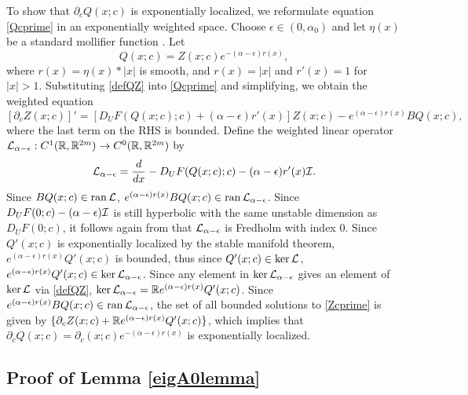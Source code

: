 \documentclass[10pt,reqno]{amsart}
\theoremstyle{plain}
\theoremstyle{definition}
\theoremstyle{remark}
\numberwithin{theorem}{section}
\numberwithin{equation}{section}
\begin{document}
To show that $\partial_c Q(x; c)$ is exponentially localized, we reformulate equation \cref{Qcprime} in an exponentially weighted space. Choose $\epsilon \in (0,\alpha_0)$ and let $\eta(x)$ be a standard mollifier function \cite[Section~C.5]{Evans2010}. Let
\begin{equation}\label{defQZ}
Q(x; c) = Z(x; c) e^{-(\alpha - \epsilon)r(x)},
\end{equation}
where $r(x) = \eta(x) * |x|$ is smooth, and $r(x) = |x|$ and $r'(x) = 1$ for $|x| > 1$. Substituting \cref{defQZ} into \cref{Qcprime} and simplifying, we obtain the weighted equation
\begin{equation}\label{Zcprime}
[\partial_c Z(x; c)]' = [D_U F(Q(x;c); c) + (\alpha - \epsilon) r'(x) ] Z(x; c) - e^{(\alpha - \epsilon)r(x)} B Q(x;c),
\end{equation}
where the last term on the RHS is bounded. Define the weighted linear operator $\mathcal{L}_{\alpha - \epsilon}: C^1(\mathbb{R}, \mathbb{R}^{2m}) \rightarrow C^0(\mathbb{R}, \mathbb{R}^{2m})$ by
\begin{equation}\label{defLtvalpha}
\mathcal{L}_{\alpha - \epsilon} = \frac{d}{dx} - D_U F(Q(x;c); c) - (\alpha - \epsilon) r'(x) \mathcal{I}.
\end{equation}
Since $B Q(x;c) \in \operatorname{ran} \mathcal{L}$, $e^{(\alpha - \epsilon)r(x)} B Q(x;c) \in \operatorname{ran} \mathcal{L}_{\alpha - \epsilon}$. Since $D_U F(0; c)-(\alpha-\epsilon)\mathcal{I}$ is still hyperbolic with the same unstable dimension as $D_U F(0; c)$, it follows again from \cite[Lemma 4.2]{Palmer1984} that $\mathcal{L}_{\alpha - \epsilon}$ is Fredholm with index 0. Since $Q'(x; c)$ is exponentially localized by the stable manifold theorem, $e^{(\alpha - \epsilon)r(x)} Q'(x; c)$ is bounded, thus since $Q'(x; c) \in \mathop\mathrm{ker}\nolimits \mathcal{L}$, $e^{(\alpha - \epsilon)r(x)} Q'(x; c) \in \mathop\mathrm{ker}\nolimits \mathcal{L}_{\alpha - \epsilon}$. Since any element in $\mathop\mathrm{ker}\nolimits \mathcal{L}_{\alpha - \epsilon}$ gives an element of $\mathop\mathrm{ker}\nolimits \mathcal{L}$ via \cref{defQZ}, $\mathop\mathrm{ker}\nolimits \mathcal{L}_{\alpha - \epsilon} = \mathbb{R} e^{(\alpha - \epsilon)r(x)} Q'(x; c)$. Since $e^{(\alpha - \epsilon)r(x)} B Q(x;c) \in \operatorname{ran} \mathcal{L}_{\alpha - \epsilon}$, the set of all bounded solutions to \cref{Zcprime} is given by $\{ \partial_c Z(x; c) + \mathbb{R} e^{(\alpha - \epsilon)r(x)} Q'(x;c) \}$, which implies that $\partial_c Q(x; c) = \partial_c(x; c) e^{-(\alpha - \epsilon)r(x)}$ is exponentially localized.

\subsection{Proof of Lemma \ref{eigA0lemma}}
\end{document}
